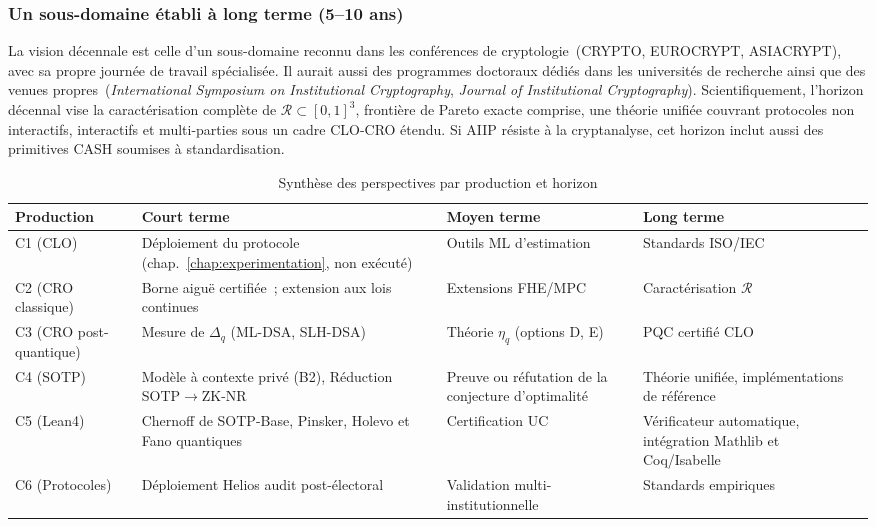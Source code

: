 \begin{sloppypar}
\subsubsection{Un sous-domaine \'etabli \`a long terme (5--10 ans)}
\label{subsubsec:horizon_long_terme}

La vision d\'ecennale est celle d'un sous-domaine reconnu dans les
conf\'erences de cryptologie~(CRYPTO, EUROCRYPT, ASIACRYPT), avec sa propre
journ\'ee de travail sp\'ecialis\'ee. Il aurait aussi des programmes doctoraux d\'edi\'es dans
les universit\'es de recherche ainsi que des venues
propres~(\textit{International Symposium on Institutional Cryptography},
\textit{Journal of Institutional Cryptography}). Scientifiquement, l'horizon
d\'ecennal vise la caract\'erisation compl\`ete de $\mathcal{R} \subset [0,1]^3$,
fronti\`ere de Pareto exacte comprise, une th\'eorie unifi\'ee couvrant
protocoles non interactifs, interactifs et multi-parties sous un cadre
CLO-CRO \'etendu. Si AIIP r\'esiste \`a la cryptanalyse, cet horizon inclut aussi des primitives
CASH soumises \`a standardisation.

\begin{table}[htbp]
\centering
\caption{Synth\`ese des perspectives par production et horizon}
\label{tab:perspectives_horizons}
\small
\begin{tabular}{@{}p{2.5cm}p{3cm}p{3cm}p{3cm}@{}}
\toprule
\textbf{Production} & \textbf{Court terme} & \textbf{Moyen terme} & \textbf{Long terme} \\
\midrule
C1 (CLO) & D\'eploiement du protocole (chap.~\ref{chap:experimentation}, non ex\'ecut\'e) & Outils ML d'estimation & Standards ISO/IEC \\
C2 (CRO classique) & Borne aigu\"e certifi\'ee~; extension aux lois continues & Extensions FHE/MPC & Caract\'erisation $\mathcal{R}$ \\
C3 (CRO post-quantique) & Mesure de $\Delta_q$ (ML-DSA, SLH-DSA) & Th\'eorie $\eta_q$ (options D, E) & PQC certifi\'e CLO \\
C4 (SOTP) & Mod\`ele \`a contexte priv\'e (B2), R\'eduction SOTP$\to$ZK-NR & Preuve ou r\'efutation de la conjecture d'optimalit\'e & Th\'eorie unifi\'ee, impl\'ementations de r\'ef\'erence \\
C5 (Lean4) & Chernoff de SOTP-Base, Pinsker, Holevo et Fano quantiques & Certification UC & V\'erificateur automatique, int\'egration Mathlib et Coq/Isabelle \\
C6 (Protocoles) & D\'eploiement Helios audit post-\'electoral & Validation multi-institutionnelle & Standards empiriques \\
\bottomrule
\end{tabular}
\end{table}


\end{sloppypar}
